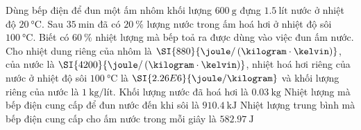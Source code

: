 \begin{ex}
	Dùng bếp điện để đun một ấm nhôm khối lượng $\SI{600}{\gram}$ đựng $\SI{1.5}{\text{lít}}$ nước ở nhiệt độ $\SI{20}{\celsius}$. Sau $\SI{35}{\minute}$ đã có $\SI{20}{\percent}$ lượng nước trong ấm hoá hơi ở nhiệt độ sôi $\SI{100}{\celsius}$. Biết có $\SI{60}{\percent}$ nhiệt lượng mà bếp toả ra được dùng vào việc đun ấm nước. Cho nhiệt dung riêng của nhôm là $\SI{880}{\joule/\left(\kilogram\cdot\kelvin\right)}$, của nước là $\SI{4200}{\joule/\left(\kilogram\cdot\kelvin\right)}$, nhiệt hoá hơi riêng của nước ở nhiệt độ sôi $\SI{100}{\celsius}$ là $\SI{2.26E6}{\joule/\kilogram}$ và khối lượng riêng của nước là $\SI{1}{\kilogram/\text{lít}}$.
	{\True Khối lượng nước đã hoá hơi là $\SI{0.03}{\kilogram}$}
	{\True Nhiệt lượng mà bếp điện cung cấp để đun nước đến khi sôi là $\SI{910.4}{\kilo\joule}$}
	{Nhiệt lượng trung bình mà bếp điện cung cấp cho ấm nước trong mỗi giây là $\SI{582.97}{\joule}$}
\end{ex}

